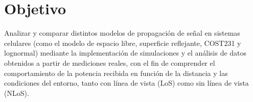 \section{Objetivo}

Analizar y comparar distintos modelos de propagación de señal en sistemas celulares (como el modelo de espacio libre, superficie reflejante, COST231 y lognormal) mediante la implementación de simulaciones y el análisis de datos obtenidos a partir de mediciones reales, con el fin de comprender el comportamiento de la potencia recibida en función de la distancia y las condiciones del entorno, tanto con línea de vista (LoS) como sin línea de vista (NLoS).
